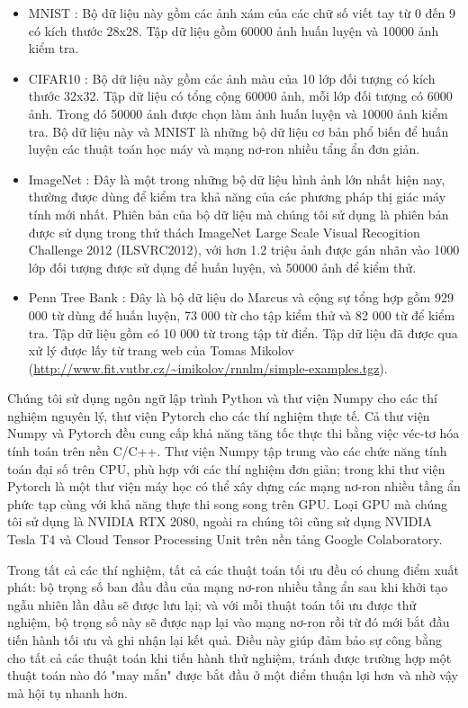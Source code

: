 \begin{itemize}
	\item MNIST \cite{lecun2010mnist}: Bộ dữ liệu này gồm các ảnh xám của các chữ số viết tay từ 0 đến 9 có kích thước 28x28. Tập dữ liệu gồm 60000 ảnh huấn luyện và 10000 ảnh kiểm tra.
	\item CIFAR10 \cite{krizhevsky2009cifar10}: Bộ dữ liệu này gồm các ảnh màu của 10 lớp đối tượng có kích thước 32x32. Tập dữ liệu có tổng cộng 60000 ảnh, mỗi lớp đối tượng có 6000 ảnh. Trong đó 50000 ảnh được chọn làm ảnh huấn luyện và 10000 ảnh kiểm tra. Bộ dữ liệu này và MNIST là những bộ dữ liệu cơ bản phổ biến để huấn luyện các thuật toán học máy và mạng nơ-ron nhiều tẩng ẩn đơn giản.
	\item ImageNet \cite{deng2009imagenet}: Đây là một trong những bộ dữ liệu hình ảnh lớn nhất hiện nay, thường được dùng để kiểm tra khả năng của các phương pháp thị giác máy tính mới nhất. Phiên bản của bộ dữ liệu mà chúng tôi sử dụng là phiên bản được sử dụng trong thử thách ImageNet Large Scale Visual Recogition Challenge 2012 (ILSVRC2012), với hơn 1.2 triệu ảnh được gán nhãn vào 1000 lớp đối tượng được sử dụng để huấn luyện, và 50000 ảnh để kiểm thử.
	\item Penn Tree Bank \cite{marcus1993ptb}: Đây là bộ dữ liệu do Marcus và cộng sự tổng hợp gồm 929 000 từ dùng để huấn luyện, 73 000 từ cho tập kiểm thử và 82 000 từ để kiểm tra. Tập dữ liệu gồm có 10 000 từ trong tập từ điển. Tập dữ liệu đã được qua xử lý được lấy từ trang web của Tomas Mikolov (\url{http://www.fit.vutbr.cz/~imikolov/rnnlm/simple-examples.tgz}).
\end{itemize}

Chúng tôi sử dụng ngôn ngữ lập trình Python và thư viện Numpy cho các thí nghiệm nguyên lý, thư viện Pytorch cho các thí nghiệm thực tế. Cả thư viện Numpy và Pytorch đều cung cấp khả năng tăng tốc thực thi bằng việc véc-tơ hóa tính toán trên nền C/C++. Thư viện Numpy tập trung vào các chức năng tính toán đại số trên CPU, phù hợp với các thí nghiệm đơn giản; trong khi thư viện Pytorch là một thư viện máy học có thể xây dựng các mạng nơ-ron nhiều tầng ẩn phức tạp cùng với khả năng thực thi song song trên GPU. Loại GPU mà chúng tôi sử dụng là NVIDIA RTX 2080, ngoài ra chúng tôi cũng sử dụng NVIDIA Tesla T4 và Cloud Tensor Processing Unit trên nền tảng Google Colaboratory.

Trong tất cả các thí nghiệm, tất cả các thuật toán tối ưu đều có chung điểm xuất phát: bộ trọng số ban đầu đầu của mạng nơ-ron nhiều tầng ẩn sau khi khởi tạo ngẫu nhiên lần đầu sẽ được lưu lại; và với mỗi thuật toán tối ưu được thử nghiệm, bộ trọng số này sẽ được nạp lại vào mạng nơ-ron rồi từ đó mới bắt đầu tiến hành tối ưu và ghi nhận lại kết quả. Điều này giúp đảm bảo sự công bằng cho tất cả các thuật toán khi tiến hành thử nghiệm, tránh được trường hợp một thuật toán nào đó "may mắn" được bắt đầu ở một điểm thuận lợi hơn và nhờ vậy mà hội tụ nhanh hơn.

